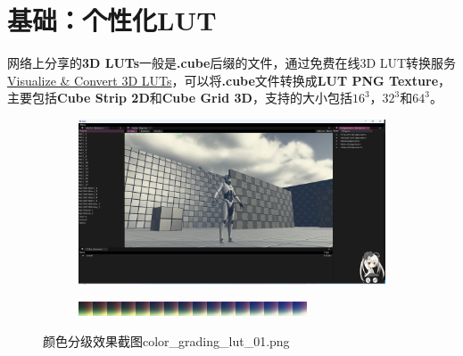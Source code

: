 \documentclass{ctexart}
\begin{document}
    \section{基础：个性化LUT} \label{section:basic2}
    网络上分享的\textbf{3D LUTs}一般是\textbf{.cube}后缀的文件，通过免费在线3D LUT转换服务\href{https://www.color.io/free-online-lut-converter}{Visualize \& Convert 3D LUTs}，可以将\textbf{.cube}文件转换成\textbf{LUT PNG Texture}，主要包括\textbf{Cube Strip 2D}和\textbf{Cube Grid 3D}，支持的大小包括$ 16^3 $，$ 32^3 $和$ 64^3 $。    
    \begin{figure}[!htb]
        \centering
        \begin{subfigure}{1.0\textwidth}
            \includegraphics[width=\textwidth]{screen_shot_color_grading_map_color_grading_lut_01.png}
        \end{subfigure}
        \begin{subfigure}{1.0\textwidth}
            \includegraphics[width=\textwidth]{color_grading_lut_01.png}
        \end{subfigure}      
        \caption{颜色分级效果截图color\_grading\_lut\_01.png}
    \end{figure}
\end{document}
